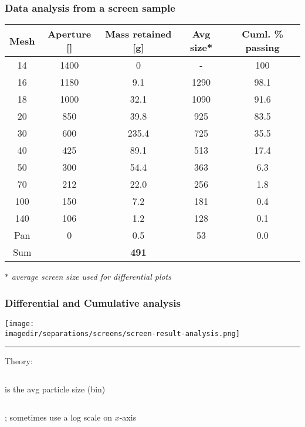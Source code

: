 \begin{frame}\frametitle{Data analysis from a screen sample}
	\begin{tabular}{ccc|c|c}
		Mesh&Aperture [\micron]	& Mass retained [g]	& Avg size* & {\scriptsize Cuml. \% passing} \\ \hline
		14	& 1400		& 0		& -      &  100           \\
		16	& 1180		& 9.1	& 1290   &  98.1          \\
		18	& 1000		& 32.1	& 1090   &  91.6          \\
		20	& 850		& 39.8	& 925    &  83.5          \\
		30	& 600		& 235.4	& 725    &  35.5          \\
		40	& 425		& 89.1	& 513    &  17.4          \\
		50	& 300		& 54.4	& 363    &  6.3           \\
		70	& 212		& 22.0	& 256    &  1.8           \\
		100	& 150		& 7.2	& 181    &  0.4           \\
		140	& 106		& 1.2	& 128    &  0.1           \\
		Pan	& 0			& 0.5	& 53     &  0.0           \\ \hline
		Sum	&  			& \textbf{491}   &     			  \\ \hline
	\end{tabular}

	\vspace{12pt}
	$\ast$ \emph{\scriptsize average screen size used for differential plots}
\end{frame}

\begin{frame}\frametitle{Differential and Cumulative analysis}
	\begin{center}
		\texttt{[image: \\imagedir/separations/screens/screen-result-analysis.png]}
	\end{center}
	\hrule
	\vspace{6pt}
	Theory:
	\begin{columns}[t]
			{\color{myBlue}{\[f(x) = \displaystyle\frac{dF(x)}{dx}\]}}
			\vspace{-12pt}
			{\color{myBlue}{$x$} is the avg particle size (bin)}
			
			{\color{myGreen}{\[F(x) = \text{percent passing curve}\]}}
			\vspace{-12pt}
			{\color{myGreen}{\[1-F(x) = \text{percent retained curve}\]}}
	\end{columns}
	\vspace{18pt}
	; sometimes use a log scale on $x$-axis
\end{frame}

